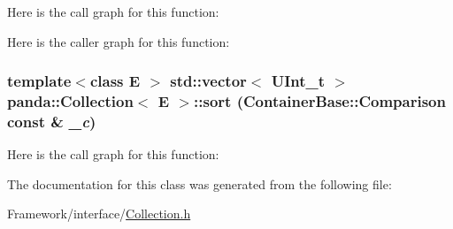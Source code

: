 Here is the call graph for this function:

Here is the caller graph for this function:\hypertarget{classpanda_1_1Collection_a10c98d854734dc7d8063eca3ca6e01ad}{
\subsubsection[{sort}]{\setlength{\rightskip}{0pt plus 5cm}template$<$class E $>$ std::vector$<$ UInt\_\-t $>$ {\bf panda::Collection}$<$ E $>$::sort ({\bf ContainerBase::Comparison} const \& {\em \_\-c})}}
\label{classpanda_1_1Collection_a10c98d854734dc7d8063eca3ca6e01ad}


Here is the call graph for this function:

The documentation for this class was generated from the following file:\begin{DoxyCompactItemize}
\item 
Framework/interface/\hyperlink{Collection_8h}{Collection.h}\end{DoxyCompactItemize}
